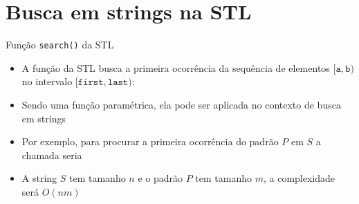 \section{Busca em strings na STL}

\begin{frame}[fragile]{Função {\tt search()} da STL}

    \begin{itemize}
        \item A função  da STL busca a primeira ocorrência da sequência de
            elementos $[\mathtt{a}, \mathtt{b})$ no intervalo $[\mathtt{first},\mathtt{last})$:

            \vspace{.1in}
            \vspace{.1in}

        \item Sendo uma função paramétrica, ela pode ser aplicada no contexto de busca em
            strings

        \item Por exemplo, para procurar a primeira ocorrência do padrão $P$ em $S$ a chamada
            seria

            \vspace{.1in}
            \vspace{.1in}

        \item A string $S$ tem tamanho $n$ e o padrão $P$ tem tamanho $m$, a complexidade será
            $O(nm)$

    \end{itemize}

\end{frame}

